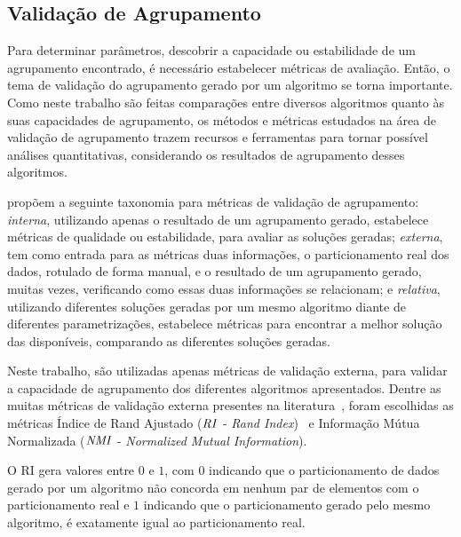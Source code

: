 \documentclass[
    12pt,                %
    oneside,            %
    a4paper,            %
    english,            %
    brazil                %
    ]{abntex2ppgsi}
\begin{document}
\subsection{Validação de Agrupamento}
\label{sec:clustering:eval}

Para determinar parâmetros, descobrir a capacidade ou estabilidade de um agrupamento encontrado, é necessário estabelecer métricas de avaliação.
Então, o tema de validação do agrupamento gerado por um algoritmo se torna importante.
Como neste trabalho são feitas comparações entre diversos algoritmos quanto às suas capacidades de agrupamento, os métodos e métricas estudados na área de validação de agrupamento trazem recursos e ferramentas para tornar possível análises quantitativas, considerando os resultados de agrupamento desses algoritmos.

 propõem a seguinte taxonomia para métricas de validação de agrupamento: \textit{interna}, utilizando apenas o resultado de um agrupamento gerado, estabelece métricas de qualidade ou estabilidade, para avaliar as soluções geradas; \textit{externa}, tem como entrada para as métricas duas informações, o particionamento real dos dados, rotulado de forma manual, e o resultado de um agrupamento gerado, muitas vezes, verificando como essas duas informações se relacionam; e \textit{relativa}, utilizando diferentes soluções geradas por um mesmo algoritmo diante de diferentes parametrizações, estabelece métricas para encontrar a melhor solução das disponíveis, comparando as diferentes soluções geradas.

Neste trabalho, são utilizadas apenas métricas de validação externa, para validar a capacidade de agrupamento dos diferentes algoritmos apresentados.
Dentre as muitas métricas de validação externa presentes na literatura~\cite{Halkidi2002a,Halkidi2002b}, foram escolhidas as métricas Índice de Rand Ajustado ($\text{\textit{RI}}$ - \textit{Rand Index})~\cite{Rand1971} e Informação Mútua Normalizada ($\text{\textit{NMI}}$ - \textit{Normalized Mutual Information}).

O RI gera valores entre $0$ e $1$, com $0$ indicando que o particionamento de dados gerado por um algoritmo não concorda em nenhum par de elementos com o particionamento real e $1$ indicando que o particionamento gerado pelo mesmo algoritmo, é exatamente igual ao particionamento real.
\end{document}
